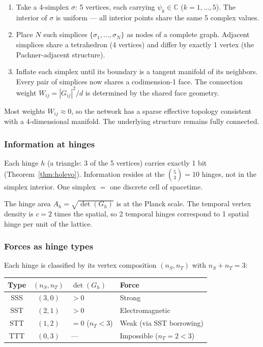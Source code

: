 \documentclass[12pt]{article}
\theoremstyle{remark}
\theoremstyle{definition}
\begin{document}
\begin{enumerate}
\item Take a 4-simplex $\sigma$: 5 vertices, each carrying $\psi_k \in \mathbb{C}$ ($k = 1, \ldots, 5$). The interior of $\sigma$ is uniform --- all interior points share the same 5 complex values.

\item Place $N$ such simplices $\{\sigma_1, \ldots, \sigma_N\}$ as nodes of a complete graph. Adjacent simplices share a tetrahedron (4 vertices) and differ by exactly 1 vertex (the Pachner-adjacent structure).

\item Inflate each simplex until its boundary is a tangent manifold of its neighbors. Every pair of simplices now shares a codimension-1 face. The connection weight $W_{ij} = |G_{ij}|^2/d$ is determined by the shared face geometry.
\end{enumerate}

Most weights $W_{ij} \approx 0$, so the network has a sparse effective topology consistent with a 4-dimensional manifold. The underlying structure remains fully connected.

\subsubsection{Information at hinges}

Each hinge $h$ (a triangle: 3 of the 5 vertices) carries exactly 1 bit (Theorem~\ref{thm:holevo}). Information resides at the $\binom{5}{3} = 10$ hinges, not in the simplex interior. One simplex $=$ one discrete cell of spacetime.

The hinge area $A_h = \sqrt{\det(G_h)}$ is at the Planck scale. The temporal vertex density is $c = 2$ times the spatial, so 2 temporal hinges correspond to 1 spatial hinge per unit of the lattice.

\subsubsection{Forces as hinge types}

Each hinge is classified by its vertex composition $(n_S, n_T)$ with $n_S + n_T = 3$:

\begin{center}
\begin{tabular}{ccll}
\hline
Type & $(n_S, n_T)$ & $\det(G_h)$ & Force \\
\hline
SSS & $(3,0)$ & $> 0$ & Strong \\
SST & $(2,1)$ & $> 0$ & Electromagnetic \\
STT & $(1,2)$ & $= 0$ ($n_T < 3$) & Weak (via SST borrowing) \\
TTT & $(0,3)$ & --- & Impossible ($n_T = 2 < 3$) \\
\hline
\end{tabular}
\end{center}
\end{document}

